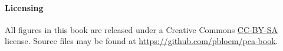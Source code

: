 \documentclass{pca}
\theoremstyle{theorem}
\theoremstyle{proof}
\begin{document}
\paragraph{Licensing} All figures in this book are released under a Creative Commons \href{https://creativecommons.org/licenses/by-sa/2.0/}{CC-BY-SA} license. Source files may be found at \url{https://github.com/pbloem/pca-book}.


















\appendix




\pagestyle{empty}

\printindex
\end{document}
